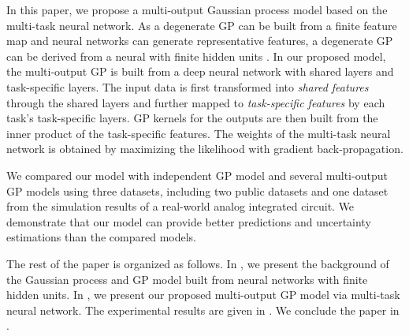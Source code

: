 In this paper, we propose a multi-output Gaussian process model based on the multi-task neural network. As a degenerate GP can be built from a finite feature map and neural networks can generate representative features, a degenerate GP can be derived from a neural with finite hidden units \cite{lazaro2010marginalized, huang2015scalable}. In our proposed model, the multi-output GP is built from a deep neural network with shared layers and task-specific layers. The input data is first transformed into \emph{shared features} through the shared layers and further mapped to \emph{task-specific features} by each task's task-specific layers. GP kernels for the outputs are then built from the inner product of the task-specific features. The weights of the multi-task neural network is obtained by maximizing the likelihood with gradient back-propagation.

We compared our model with independent GP model and several multi-output GP models using three datasets, including two public datasets and one dataset from the simulation results of a real-world analog integrated circuit. We demonstrate that our model can provide better predictions and uncertainty estimations than the compared models.

The rest of the paper is organized as follows. In , we present the background of the Gaussian process and GP model built from neural networks with finite hidden units. In , we present our proposed multi-output GP model via multi-task neural network. The experimental results are given in . We conclude the paper in .

